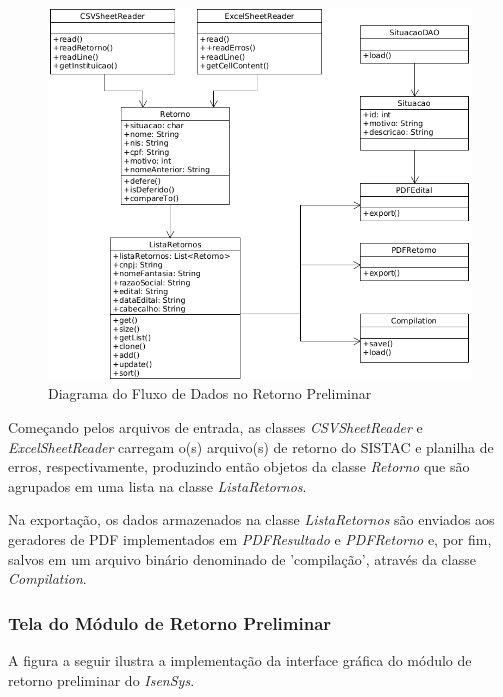 \documentclass[
	12pt,			%
	openright,		%
	oneside,	
	a4paper,		%
	english,		%
	brazil			%
]{abntex2/abntex2}  %
\begin{document}
					\begin{figure}[ht]
						\begin{center}
							
							\caption{Diagrama do Fluxo de Dados no Retorno Preliminar}
							\label{preliminar-fluxo}
							
							\includegraphics[scale=0.5]{img/retorno-prelim-uml}
							
						\end{center}
					\end{figure}
	
					Começando pelos arquivos de entrada, as classes \textit{CSVSheetReader} e \textit{ExcelSheetReader} carregam o(s) arquivo(s) de retorno do SISTAC e planilha de erros, respectivamente, produzindo então objetos da classe \textit{Retorno} que são agrupados em uma lista na classe \textit{ListaRetornos}.
	
					Na exportação, os dados armazenados na classe \textit{ListaRetornos} são enviados aos geradores de PDF implementados em \textit{PDFResultado} e \textit{PDFRetorno} e, por fim, salvos em um arquivo binário denominado de 'compilação', através da classe \textit{Compilation}.
	
				\subsubsection{Tela do Módulo de Retorno Preliminar}
	
					A figura a seguir ilustra a implementação da interface gráfica do módulo de retorno preliminar do \textit{IsenSys}.
	
\end{document}
